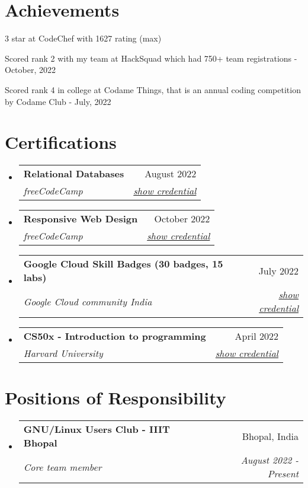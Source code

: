 \documentclass[a4paper,20pt]{article}
\makeatletter
\newcommand{\resumeSubheading}[4]{
  \vspace{-1pt}\item
    \begin{tabular*}{0.97\textwidth}{l@{\extracolsep{\fill}}r}
      \textbf{#1} & #2 \\
      \textit{#3} & \textit{#4} \\
    \end{tabular*}\vspace{-5pt}
}
\newcommand{\resumeSubHeadingListStart}{\begin{itemize}[leftmargin=*]}
\newcommand{\resumeSubHeadingListEnd}{\end{itemize}}
\makeatother
\begin{document}
\vspace{-5pt}
\section{Achievements}
\begin{description}[font=$\bullet$]
    \item {3 star at CodeChef with 1627 rating (max)}
    \vspace{-5pt}
    \item {Scored rank 2 with my team at HackSquad which had 750+ team registrations - October, 2022}
    \vspace{-5pt}
    \item {Scored rank 4 in college at Codame Things, that is an annual coding competition by Codame Club - July, 2022}
\end{description}
\vspace{-5pt}
\section{Certifications}
\resumeSubHeadingListStart
    \resumeSubheading
    {Relational Databases}{August 2022}
    {freeCodeCamp}{\href{https://www.freecodecamp.org/certification/satyamrs00/relational-database-v8}{show credential}}

    \resumeSubheading
    {Responsive Web Design}{October 2022}
    {freeCodeCamp}{\href{https://www.freecodecamp.org/certification/satyamrs00/responsive-web-design}{show credential}}
    
    \resumeSubheading
    {Google Cloud Skill Badges (30 badges, 15 labs)}{July 2022}
    {Google Cloud community India} {\href{https://www.cloudskillsboost.google/public_profiles/979efb3e-91bc-476f-ba38-d35c4879a1fa}{show credential}}

    \resumeSubheading
    {CS50x - Introduction to programming}{April 2022}
    {Harvard University}{\href{https://certificates.cs50.io/5a9d3a4b-57f0-4d46-95fa-222159e1368f.pdf?size=letter}{show credential}}
    
\resumeSubHeadingListEnd

\vspace{-5pt}
\section{Positions of Responsibility}
\resumeSubHeadingListStart
    \resumeSubheading
    {GNU/Linux Users Club - IIIT Bhopal}{Bhopal, India}
    {Core team member}{August 2022 - Present}
\resumeSubHeadingListEnd
\end{document}
